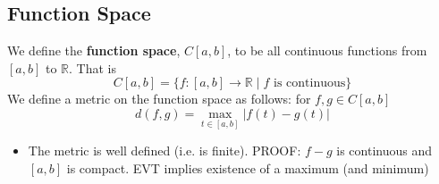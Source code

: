 \documentclass{article}
\newcommand{\R}{\mathbb{R}}
\theoremstyle{plain}
\theoremstyle{definition}
\begin{document}
		\subsection{Function Space}
		We define the \textbf{function space}, $C[a,b]$, to be all continuous functions from $[a,b]$ to $\R$. That is 
		\begin{equation*}
				C[a,b] = \{f : [a,b] \to \R \mid f \text{ is continuous} \}
		\end{equation*}
		We define a metric on the function space as follows: for $f,g\in C[a,b]$
		\begin{equation*}
				d(f, g) = \max_{t\in [a,b]} |f(t) - g(t)|
		\end{equation*}
		\begin{itemize}
				\item The metric is well defined (i.e. is finite). PROOF: $f-g$ is continuous and $[a,b]$ is compact. EVT implies existence of a maximum (and minimum)
		\end{itemize}
\end{document}
